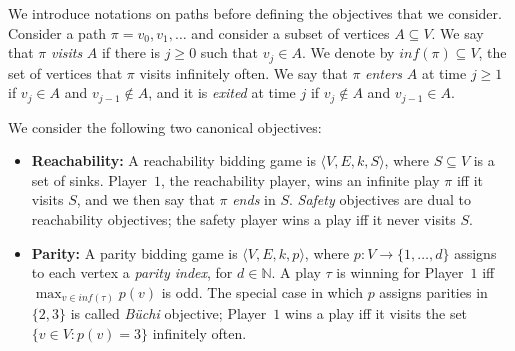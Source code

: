 \documentclass{theoretics}
\newcommand{\PO}{Player~$1$\xspace}
\newcommand{\Nat}{\mathbb{N}}
\newcommand{\zug}[1]{\langle #1  \rangle}
\renewcommand{\set}[1]{\{ #1  \}}
\begin{document}
We introduce notations on paths before defining the objectives that we consider. Consider a path $\pi = v_0,v_1,\ldots$ and consider a subset of vertices $A \subseteq V$. We say that $\pi$ {\em visits} $A$ if there is $j \geq 0$ such that $v_j \in A$. We denote by $inf(\pi) \subseteq V$, the set of vertices that $\pi$ visits infinitely often. 
We say that $\pi$ {\em enters} $A$ at time $j \geq 1$ if $v_j \in A$ and $v_{j-1} \notin A$, and it is {\em exited} at time $j$ if $v_j \notin A$ and $v_{j-1} \in A$. 

We consider the following two canonical objectives:
\begin{itemize}
\item {\bf Reachability:} A reachability bidding game is $\zug{V, E, k, S}$, where $S \subseteq V$ is a set of sinks. \PO, the reachability player, wins an infinite play $\pi$ iff it visits $S$, and we then say that $\pi$ {\em ends} in $S$. {\em Safety} objectives are dual to reachability objectives; the safety player wins a play iff it never visits $S$.  
\item {\bf Parity:}  A parity bidding game is $\zug{V, E, k, p}$, where $p: V \rightarrow \set{1,\ldots, d}$ assigns to each vertex a {\em parity index}, for $d \in \Nat$. A play $\tau$ is winning for \PO iff $\max_{v \in inf(\tau)} p(v)$ is odd. The special case in which $p$ assigns parities in $\set{2,3}$ is called {\em B\"uchi} objective;  \PO wins a play iff it visits the set $\set{v \in V: p(v) = 3}$ infinitely often. 
\end{itemize}
\end{document}
